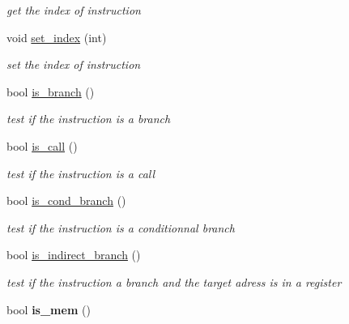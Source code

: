 \begin{DoxyCompactItemize}
\begin{DoxyCompactList}\small\item\em get the index of instruction \end{DoxyCompactList}\item 
\hypertarget{classInstruction_af1608cfea660c46e8a8b4bbac948406a}{void \hyperlink{classInstruction_af1608cfea660c46e8a8b4bbac948406a}{set\-\_\-index} (int)}\label{classInstruction_af1608cfea660c46e8a8b4bbac948406a}

\begin{DoxyCompactList}\small\item\em set the index of instruction \end{DoxyCompactList}\item 
\hypertarget{classInstruction_aab8e6a16b8bab5ca90b554086cc3c825}{bool \hyperlink{classInstruction_aab8e6a16b8bab5ca90b554086cc3c825}{is\-\_\-branch} ()}\label{classInstruction_aab8e6a16b8bab5ca90b554086cc3c825}

\begin{DoxyCompactList}\small\item\em test if the instruction is a branch \end{DoxyCompactList}\item 
\hypertarget{classInstruction_ab2a6352a09271a588f6930852a361f67}{bool \hyperlink{classInstruction_ab2a6352a09271a588f6930852a361f67}{is\-\_\-call} ()}\label{classInstruction_ab2a6352a09271a588f6930852a361f67}

\begin{DoxyCompactList}\small\item\em test if the instruction is a call \end{DoxyCompactList}\item 
\hypertarget{classInstruction_a1b607074554bc160142786c125bde530}{bool \hyperlink{classInstruction_a1b607074554bc160142786c125bde530}{is\-\_\-cond\-\_\-branch} ()}\label{classInstruction_a1b607074554bc160142786c125bde530}

\begin{DoxyCompactList}\small\item\em test if the instruction is a conditionnal branch \end{DoxyCompactList}\item 
\hypertarget{classInstruction_affdf2382cd36277fb4427cd3b07c1402}{bool \hyperlink{classInstruction_affdf2382cd36277fb4427cd3b07c1402}{is\-\_\-indirect\-\_\-branch} ()}\label{classInstruction_affdf2382cd36277fb4427cd3b07c1402}

\begin{DoxyCompactList}\small\item\em test if the instruction a branch and the target adress is in a register \end{DoxyCompactList}\item 
\hypertarget{classInstruction_a1c79865faf9baa4d70edf81e956d952d}{bool {\bfseries is\-\_\-mem} ()}\label{classInstruction_a1c79865faf9baa4d70edf81e956d952d}


\end{DoxyCompactItemize}
